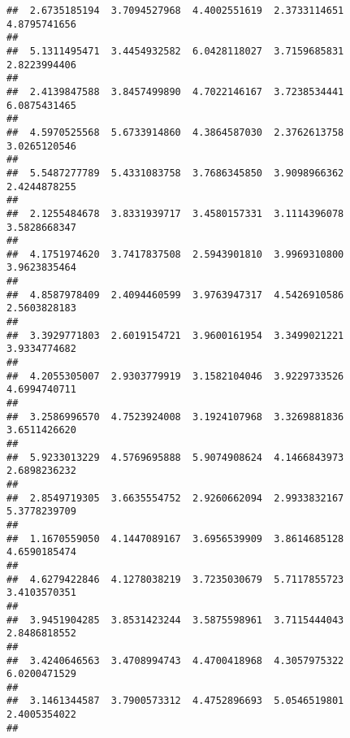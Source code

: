 \documentclass[]{article}
\begin{document}
\begin{verbatim}
##  2.6735185194  3.7094527968  4.4002551619  2.3733114651  4.8795741656 
##                                                                       
##  5.1311495471  3.4454932582  6.0428118027  3.7159685831  2.8223994406 
##                                                                       
##  2.4139847588  3.8457499890  4.7022146167  3.7238534441  6.0875431465 
##                                                                       
##  4.5970525568  5.6733914860  4.3864587030  2.3762613758  3.0265120546 
##                                                                       
##  5.5487277789  5.4331083758  3.7686345850  3.9098966362  2.4244878255 
##                                                                       
##  2.1255484678  3.8331939717  3.4580157331  3.1114396078  3.5828668347 
##                                                                       
##  4.1751974620  3.7417837508  2.5943901810  3.9969310800  3.9623835464 
##                                                                       
##  4.8587978409  2.4094460599  3.9763947317  4.5426910586  2.5603828183 
##                                                                       
##  3.3929771803  2.6019154721  3.9600161954  3.3499021221  3.9334774682 
##                                                                       
##  4.2055305007  2.9303779919  3.1582104046  3.9229733526  4.6994740711 
##                                                                       
##  3.2586996570  4.7523924008  3.1924107968  3.3269881836  3.6511426620 
##                                                                       
##  5.9233013229  4.5769695888  5.9074908624  4.1466843973  2.6898236232 
##                                                                       
##  2.8549719305  3.6635554752  2.9260662094  2.9933832167  5.3778239709 
##                                                                       
##  1.1670559050  4.1447089167  3.6956539909  3.8614685128  4.6590185474 
##                                                                       
##  4.6279422846  4.1278038219  3.7235030679  5.7117855723  3.4103570351 
##                                                                       
##  3.9451904285  3.8531423244  3.5875598961  3.7115444043  2.8486818552 
##                                                                       
##  3.4240646563  3.4708994743  4.4700418968  4.3057975322  6.0200471529 
##                                                                       
##  3.1461344587  3.7900573312  4.4752896693  5.0546519801  2.4005354022 
##                                                                       

\end{verbatim}
\end{document}
